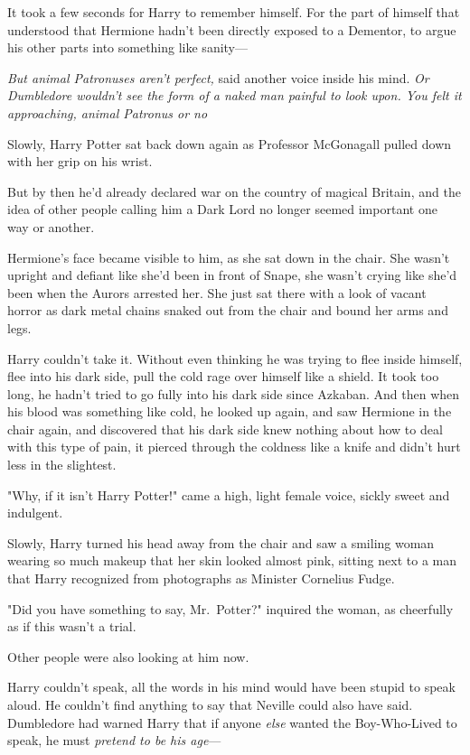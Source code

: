 It took a few seconds for Harry to remember himself. For the part of himself
that understood that Hermione hadn't been directly exposed to a Dementor, to
argue his other parts into something like sanity---

\emph{But animal Patronuses aren't perfect,} said another voice inside his
mind. \emph{Or Dumbledore wouldn't see the form of a naked man painful to look
upon. You felt it approaching, animal Patronus or no{\el}}

Slowly, Harry Potter sat back down again as Professor McGonagall pulled down
with her grip on his wrist.

But by then he'd already declared war on the country of magical Britain, and
the idea of other people calling him a Dark Lord no longer seemed important one
way or another.

Hermione's face became visible to him, as she sat down in the chair. She wasn't
upright and defiant like she'd been in front of Snape, she wasn't crying like
she'd been when the Aurors arrested her. She just sat there with a look of
vacant horror as dark metal chains snaked out from the chair and bound her arms
and legs.

Harry couldn't take it. Without even thinking he was trying to flee inside
himself, flee into his dark side, pull the cold rage over himself like a
shield. It took too long, he hadn't tried to go fully into his dark side since
Azkaban. And then when his blood was something like cold, he looked up again,
and saw Hermione in the chair again, and discovered that his dark side knew
nothing about how to deal with this type of pain, it pierced through the
coldness like a knife and didn't hurt less in the slightest.

"Why, if it isn't Harry Potter!" came a high, light female voice, sickly sweet
and indulgent.

Slowly, Harry turned his head away from the chair and saw a smiling woman
wearing so much makeup that her skin looked almost pink, sitting next to a man
that Harry recognized from photographs as Minister Cornelius Fudge.

"Did you have something to say, Mr.~Potter?" inquired the woman, as cheerfully
as if this wasn't a trial.

Other people were also looking at him now.

Harry couldn't speak, all the words in his mind would have been stupid to speak
aloud. He couldn't find anything to say that Neville could also have said.
Dumbledore had warned Harry that if anyone \emph{else} wanted the Boy-Who-Lived
to speak, he must \emph{pretend to be his age}---

